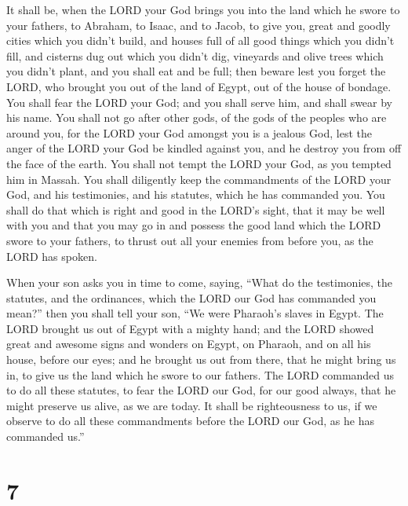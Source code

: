  It shall be, when the LORD your God brings you into the
land which he swore to your fathers, to Abraham, to Isaac, and to Jacob,
to give you, great and goodly cities which you didn't build,
 and houses full of all good things which you didn't fill,
and cisterns dug out which you didn't dig, vineyards and olive trees
which you didn't plant, and you shall eat and be full; 
then beware lest you forget the LORD, who brought you out of the land of
Egypt, out of the house of bondage.  You shall fear the
LORD your God; and you shall serve him, and shall swear by his name.
 You shall not go after other gods, of the gods of the
peoples who are around you,  for the LORD your God amongst
you is a jealous God, lest the anger of the LORD your God be kindled
against you, and he destroy you from off the face of the earth.
 You shall not tempt the LORD your God, as you tempted him
in Massah.  You shall diligently keep the commandments of
the LORD your God, and his testimonies, and his statutes, which he has
commanded you.  You shall do that which is right and good
in the LORD's sight, that it may be well with you and that you may go in
and possess the good land which the LORD swore to your fathers,
 to thrust out all your enemies from before you, as the
LORD has spoken.

 When your son asks you in time to come, saying, ``What do
the testimonies, the statutes, and the ordinances, which the LORD our
God has commanded you mean?''  then you shall tell your
son, ``We were Pharaoh's slaves in Egypt. The LORD brought us out of
Egypt with a mighty hand;  and the LORD showed great and
awesome signs and wonders on Egypt, on Pharaoh, and on all his house,
before our eyes;  and he brought us out from there, that he
might bring us in, to give us the land which he swore to our fathers.
 The LORD commanded us to do all these statutes, to fear
the LORD our God, for our good always, that he might preserve us alive,
as we are today.  It shall be righteousness to us, if we
observe to do all these commandments before the LORD our God, as he has
commanded us.''

\hypertarget{section-6}{%
\section{7}\label{section-6}}


